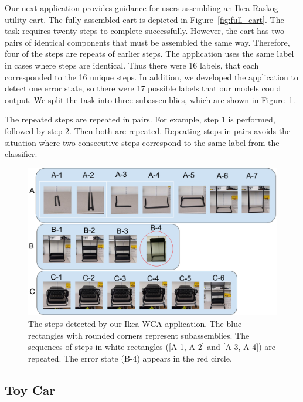 Our next application provides guidance for users assembling an Ikea Raskog
utility cart.
The fully assembled cart is depicted in Figure~\ref{fig:full_cart}.
The task requires twenty steps to complete successfully.
However, the cart has two pairs of identical components that must be
assembled the same way.
Therefore, four of the steps are repeats of earlier steps.
The application uses the same label in cases where steps are identical.
Thus there were 16 labels, that each corresponded to the 16 unique steps.
In addition, we developed the application to detect one error state, so there
were 17 possible labels that our models could output.
We split the task into three subassemblies, which are shown in
Figure~\ref{fig:ikea_cart}.

The repeated steps are repeated in pairs. For example, step 1 is performed,
followed by step 2.
Then both are repeated.
Repeating steps in pairs avoids the situation where two consecutive steps
correspond to the same label from the classifier.

\begin{figure}
  \includegraphics[width=\columnwidth]{figures/ikea_subassemblies.pdf}
  \caption{
    The steps detected by our Ikea WCA application.
    The blue rectangles with rounded corners represent subassemblies.
    The sequences of steps in white rectangles ([A-1, A-2] and [A-3, A-4])
    are repeated.
    The error state (B-4) appears in the red circle.
  }\label{fig:ikea_cart}
\end{figure}

\subsection{Toy Car}\label{sec:toy_car}

